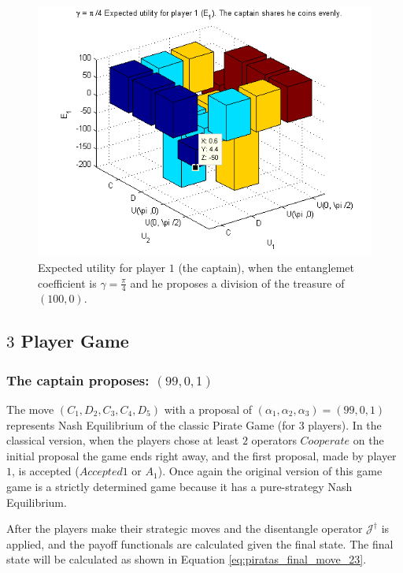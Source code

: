\documentclass[10pt,twocolumn]{llncs}
\begin{document}
\begin{figure}[h!]
\centering 
\includegraphics[scale=0.60]{Figures/1.5qubit/piadividirpor4.png}
\caption{Expected utility for player $1$ (the captain), when the entanglemet coefficient is $\gamma=\frac{\pi}{4}$ and he proposes a division of the treasure of $(100,0)$.}
\label{fig:pg_2players_99_0_1:33jesus}
\end{figure}

\subsection{$3$ Player Game}
\label{subsec:3playergame}


\subsubsection{The captain proposes: $(99, 0, 1)$}
\label{subsubsec:3playergame99}

The move $(C_1,D_2,C_3,C_4,D_5)$ with a proposal of $(\alpha_{1}, \alpha_{2}, \alpha_{3}) =(99, 0, 1)$ represents Nash Equilibrium of the classic Pirate Game (for $3$ players). In the classical version, when the players chose at least $2$ operators $Cooperate$ on the initial proposal the game ends right away, and the first proposal, made by player $1$, is accepted ($Accepted 1$ or $A_{1}$). Once again the original version of this game game is a strictly determined game because it has a pure-strategy Nash Equilibrium.

After the players make their strategic moves and the disentangle operator $\mathcal{J}^{\dagger}$ is applied, and the payoff functionals are calculated given the final state. The final state will be calculated as shown in Equation \ref{eq:piratas_final_move_23}.
\end{document}
